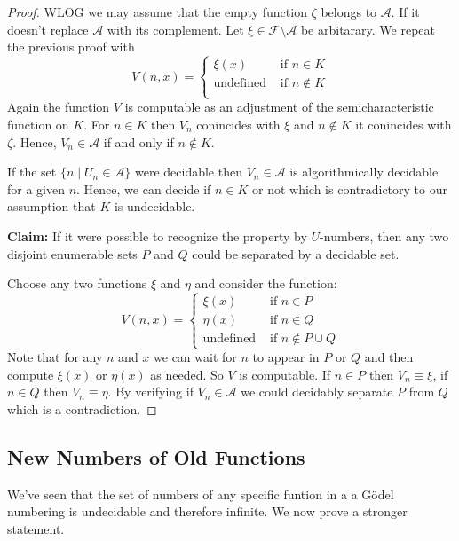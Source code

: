 \documentclass[10pt, letterpaper]{article}
\theoremstyle{remark}
\theoremstyle{definition}
\begin{document}
\begin{proof}
    WLOG we may assume that the empty function $\zeta$ belongs to $\mathscr{A}$. If it doesn't replace $\mathscr{A}$ with its complement. Let 
    $\xi \in \mathscr{F} \setminus \mathscr{A}$ be arbitarary. We repeat the previous proof with 
    \[
        V(n,x) = \begin{cases}
            \xi(x) &\text{ if } n \in K \\
            \text{undefined} &\text{ if } n \notin K \\
        \end{cases}
    \]
    Again the function $V$ is computable as an adjustment of the semicharacteristic function on $K$. For $n \in K$ then $V_n$ conincides with 
    $\xi$ and $n \notin K$ it conincides with $\zeta$. Hence, $V_n \in \mathscr{A}$ if and only if $n \notin K$.

    If the set $\{n \mid U_n \in \mathscr{A}\}$ were decidable then $V_n \in \mathscr{A}$ is algorithmically decidable for a given $n$. Hence, we can decide 
    if $n \in K$ or not which is contradictory to our assumption that $K$ is undecidable.

    \textbf{Claim: } If it were possible to recognize the property by $U$-numbers, then any two disjoint enumerable sets $P$ and $Q$ could be separated by 
    a decidable set.

    Choose any two functions $\xi$ and $\eta$ and consider the function:
    \[
        V(n,x) = \begin{cases}
            \xi(x) &\text{ if } n \in P \\
            \eta(x) &\text{ if } n \in Q \\
            \text{undefined} &\text{ if } n \notin P \cup Q 
        \end{cases}
    \]
    Note that for any $n$ and $x$ we can wait for $n$ to appear in $P$ or $Q$ and then compute $\xi(x)$ or $\eta(x)$ as needed. So 
    $V$ is computable. If $n \in P$ then $V_n \equiv \xi$, if $n \in Q$ then $V_n \equiv \eta$. By verifying if $V_n \in \mathscr{A}$ we 
    could decidably separate $P$ from $Q$ which is a contradiction.
\end{proof}

\subsection*{New Numbers of Old Functions}

We've seen that the set of numbers of any specific funtion in a a G\"{o}del numbering is undecidable and therefore infinite. We now prove a 
stronger statement.
\end{document}
